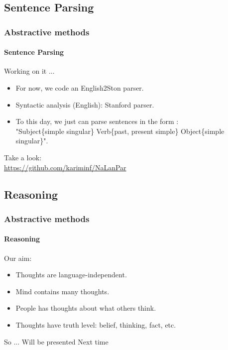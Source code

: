 \documentclass{beamer}
\begin{document}
\subsection{Sentence Parsing}
\begin{frame}
\frametitle{Abstractive methods}
\framesubtitle{Sentence Parsing}

Working on it ... \\

\begin{itemize}
\item For now, we code an English2Ston parser.
\item Syntactic analysis (English): Stanford parser.
\item To this day, we just can parse sentences in the form : \\
"Subject\{simple singular\} Verb\{past, present simple\} Object\{simple singular\}". 
\end{itemize}
\vfill
Take a look:\\
\url{https://github.com/kariminf/NaLanPar}

\end{frame}

\subsection{Reasoning}
\begin{frame}
\frametitle{Abstractive methods}
\framesubtitle{Reasoning}

Our aim: \\
\begin{itemize}
\item Thoughts are language-independent.
\item Mind contains many thoughts.
\item People has thoughts about what others think.
\item Thoughts have truth level: belief, thinking, fact, etc. 
\end{itemize}
\vfill
So ... Will be presented Next time

\end{frame}
\end{document}
